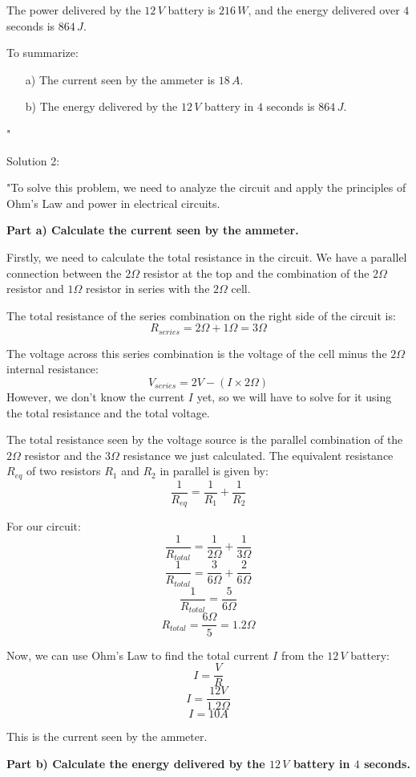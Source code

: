 The power delivered by the \(12\,V\) battery is \(216\,W\), and the energy delivered over \(4\) seconds is \(864\,J\).

To summarize:
\begin{itemize}
    \item[a)] The current seen by the ammeter is \(18\,A\).
    \item[b)] The energy delivered by the \(12\,V\) battery in \(4\) seconds is \(864\,J\).
\end{itemize} "

Solution 2:

"To solve this problem, we need to analyze the circuit and apply the principles of Ohm's Law and power in electrical circuits.

\textbf{Part a) Calculate the current seen by the ammeter.}

Firstly, we need to calculate the total resistance in the circuit. We have a parallel connection between the \(2\Omega\) resistor at the top and the combination of the \(2\Omega\) resistor and \(1\Omega\) resistor in series with the \(2\Omega\) cell.

The total resistance of the series combination on the right side of the circuit is:
\[ R_{series} = 2\Omega + 1\Omega = 3\Omega \]

The voltage across this series combination is the voltage of the cell minus the \(2\Omega\) internal resistance:
\[ V_{series} = 2V - (I \times 2\Omega) \]
However, we don't know the current \(I\) yet, so we will have to solve for it using the total resistance and the total voltage.

The total resistance seen by the voltage source is the parallel combination of the \(2\Omega\) resistor and the \(3\Omega\) resistance we just calculated. The equivalent resistance \( R_{eq} \) of two resistors \( R_1 \) and \( R_2 \) in parallel is given by:
\[ \frac{1}{R_{eq}} = \frac{1}{R_1} + \frac{1}{R_2} \]

For our circuit:
\[ \frac{1}{R_{total}} = \frac{1}{2\Omega} + \frac{1}{3\Omega} \]
\[ \frac{1}{R_{total}} = \frac{3}{6\Omega} + \frac{2}{6\Omega} \]
\[ \frac{1}{R_{total}} = \frac{5}{6\Omega} \]
\[ R_{total} = \frac{6\Omega}{5} = 1.2\Omega \]

Now, we can use Ohm's Law to find the total current \( I \) from the \(12\,V\) battery:
\[ I = \frac{V}{R} \]
\[ I = \frac{12V}{1.2\Omega} \]
\[ I = 10A \]

This is the current seen by the ammeter.

\textbf{Part b) Calculate the energy delivered by the \(12\,V\) battery in \(4\) seconds.}

